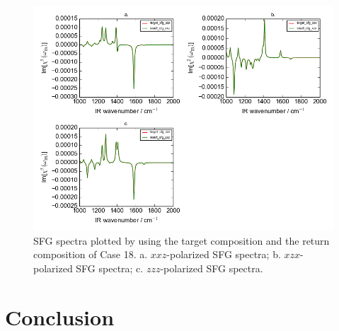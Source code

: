 \begin{figure}[!ht] 
\centering
\includegraphics[scale=0.7]{Figures/chapter4_result_target_plotting_500datapoint_sfg_version2.png}
\caption{SFG spectra plotted by using the target composition and the return composition of Case 18. a. $xxz$-polarized SFG spectra; b. $xzx$-polarized SFG spectra; c. $zzz$-polarized SFG spectra.} \label{fig:4.7}
\end{figure} 

\section{Conclusion}










